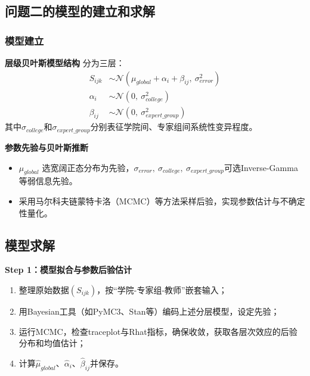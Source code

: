 \documentclass[withoutpreface,bwprint]{cumcmthesis}
\begin{document}
\subsection{问题二的模型的建立和求解}
\subsubsection{模型建立}
\textbf{层级贝叶斯模型结构}
分为三层：
\begin{align*}
    S_{ijk} &\sim \mathcal{N}(\mu_{global} + \alpha_i + \beta_{ij},\ \sigma_{error}^2) \\
    \alpha_i &\sim \mathcal{N}(0,\ \sigma_{college}^2) \\
    \beta_{ij} &\sim \mathcal{N}(0,\ \sigma_{expert\_group}^2)
\end{align*}
其中$\sigma_{college}$和$\sigma_{expert\_group}$分别表征学院间、专家组间系统性变异程度。

\textbf{参数先验与贝叶斯推断}
\begin{itemize}
    \item $\mu_{global}$ 选宽阔正态分布为先验，$\sigma_{error},\ \sigma_{college},\ \sigma_{expert\_group}$可选Inverse-Gamma等弱信息先验。
    \item 采用马尔科夫链蒙特卡洛（MCMC）等方法采样后验，实现参数估计与不确定性量化。
\end{itemize}

\subsection{模型求解}
\textbf{Step 1：模型拟合与参数后验估计}
\begin{enumerate}
    \item 整理原始数据$(S_{ijk})$，按“学院-专家组-教师”嵌套输入；
    \item 用Bayesian工具（如PyMC3、Stan等）编码上述分层模型，设定先验；
    \item 运行MCMC，检查traceplot与Rhat指标，确保收敛，获取各层次效应的后验分布和均值估计；
    \item 计算$\widehat{\mu}_{global}$、$\widehat{\alpha}_{i}$、$\widehat{\beta}_{ij}$并保存。
\end{enumerate}
\end{document}
